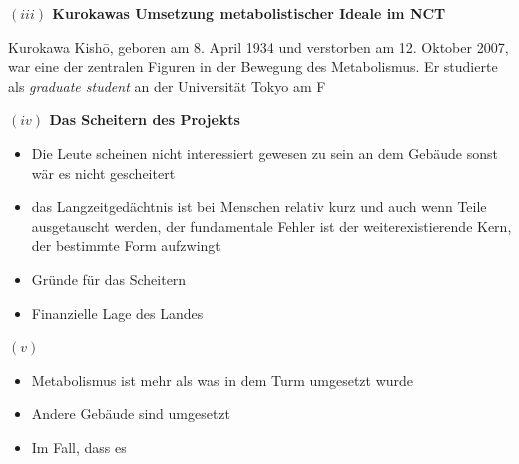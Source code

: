 \documentclass[a4paper, 12pt]{article}
\begin{document}
\begin{onehalfspace}
\vspace{5mm}
\noindent\textbf{$(iii)$ Kurokawas Umsetzung metabolistischer Ideale im NCT}


Kurokawa Kishō, geboren am 8. April 1934 und verstorben am 12. Oktober 2007, war eine der zentralen Figuren in der Bewegung des Metabolismus. Er studierte als \emph{graduate student} an der Universität Tokyo am F






\vspace{5mm}
\noindent\textbf{$(iv)$ Das Scheitern des Projekts}



\begin{itemize}
  \item Die Leute scheinen nicht interessiert gewesen zu sein an dem Gebäude sonst wär es nicht gescheitert
  \item das Langzeitgedächtnis ist bei Menschen relativ kurz und auch wenn Teile ausgetauscht werden, der fundamentale Fehler ist der weiterexistierende Kern, der bestimmte Form aufzwingt
  \item Gründe für das Scheitern
  \item Finanzielle Lage des Landes
\end{itemize}



\vspace{5mm}
\noindent\textbf{$(v)$ }



\begin{itemize}
  \item Metabolismus ist mehr als was in dem Turm umgesetzt wurde
  \item Andere Gebäude sind umgesetzt
  \item Im Fall, dass es 
\end{itemize}



\end{onehalfspace}
\end{document}
